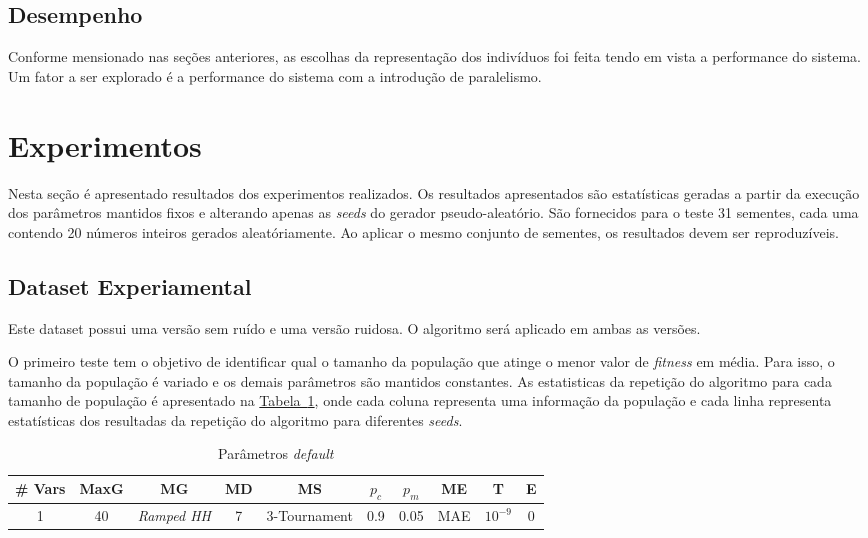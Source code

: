 \documentclass[a4paper]{paper}
\begin{document}
\subsection{Desempenho}

Conforme mensionado nas seções anteriores, as escolhas da representação dos
indivíduos foi feita tendo em vista a performance do sistema. Um fator a ser
explorado é a performance do sistema com a introdução de paralelismo.

\section{Experimentos}
Nesta seção é apresentado resultados dos experimentos realizados. Os resultados
apresentados são estatísticas geradas a partir da execução dos parâmetros
mantidos fixos e alterando apenas as \textit{seeds} do gerador
pseudo-aleatório. São fornecidos para o teste 31 sementes, cada uma contendo 20
números inteiros gerados aleatóriamente.  Ao aplicar o mesmo conjunto de
sementes, os resultados devem ser reproduzíveis.

\subsection{Dataset Experiamental}
Este dataset possui uma versão sem ruído e uma versão ruidosa. O algoritmo será
aplicado em ambas as versões.

O primeiro teste tem o objetivo de identificar qual o tamanho da população que
atinge o menor valor de \textit{fitness} em média. Para isso, o tamanho da população
é variado e os demais parâmetros são mantidos constantes. As estatisticas da repetição
do algoritmo para cada tamanho de população é apresentado na 
\hyperref[tbl:default_param]{Tabela~\ref*{tbl:default_param}}, onde cada coluna
representa uma informação da população e cada linha representa estatísticas dos
resultadas da repetição do algoritmo para diferentes \textit{seeds}. 

\noindent
\begin{table}
  \center
  \caption{Parâmetros \textit{default}}
  \label{tbl:default_param}
  \begin{tabular}{| c | c | c | c | c | c | c | c | c | c |}
    \hline
    \# Vars & MaxG & MG & MD & MS & $p_c$ & $p_m$ & ME & T & E \\
    \hline
    1 & 40 & \textit{Ramped HH} & 7 & 3-Tournament & 0.9 & 0.05 & MAE & $10^{-9}$ & 0 \\
    \hline
  \end{tabular}  
\end{table}
\end{document}
